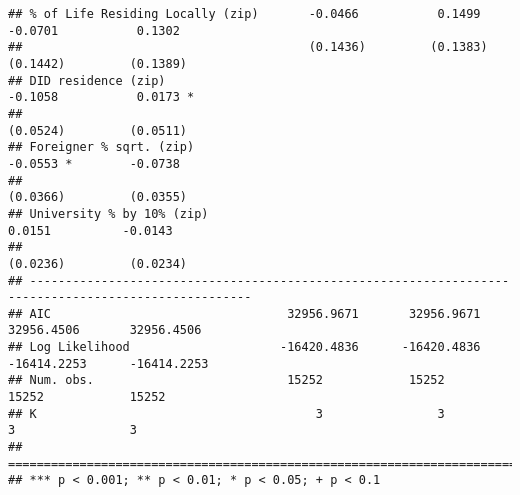 \documentclass[
]{article}
\begin{document}
\begin{verbatim}
## % of Life Residing Locally (zip)       -0.0466           0.1499          -0.0701           0.1302    
##                                        (0.1436)         (0.1383)         (0.1442)         (0.1389)   
## DID residence (zip)                                                      -0.1058           0.0173 *  
##                                                                          (0.0524)         (0.0511)   
## Foreigner % sqrt. (zip)                                                  -0.0553 *        -0.0738    
##                                                                          (0.0366)         (0.0355)   
## University % by 10% (zip)                                                 0.0151          -0.0143    
##                                                                          (0.0236)         (0.0234)   
## -----------------------------------------------------------------------------------------------------
## AIC                                 32956.9671       32956.9671       32956.4506       32956.4506    
## Log Likelihood                     -16420.4836      -16420.4836      -16414.2253      -16414.2253    
## Num. obs.                           15252            15252            15252            15252         
## K                                       3                3                3                3         
## =====================================================================================================
## *** p < 0.001; ** p < 0.01; * p < 0.05; + p < 0.1
\end{verbatim}
\end{document}
